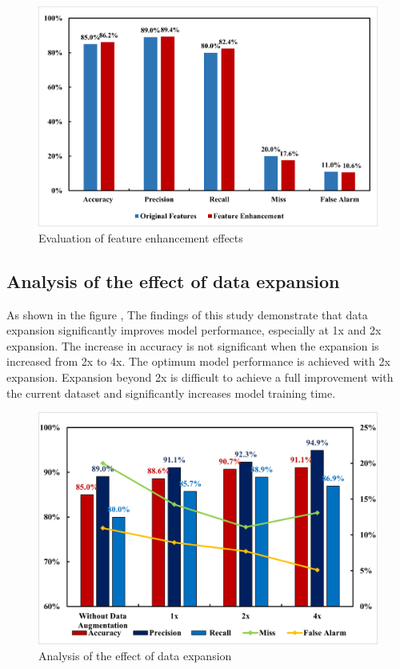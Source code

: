 \documentclass[journal,article,submit,pdftex,moreauthors]{Definitions/mdpi}
\begin{document}
\begin{figure}[h]
    \centering
    \includegraphics[width=0.75\linewidth]{图片/特征增强.png}
    \caption{Evaluation of feature enhancement effects}
    \label{fig:Evaluation of feature enhancement effects}
\end{figure}

\subsection{Analysis of the effect of data expansion}

As shown in the figure    \label{fig:Analysis of the effect of data expansion} , The findings of this study demonstrate that data expansion significantly improves model performance, especially at 1x and 2x expansion. The increase in accuracy is not significant when the expansion is increased from 2x to 4x. The optimum model performance is achieved with 2x expansion. Expansion beyond 2x is difficult to achieve a full improvement with the current dataset and significantly increases model training time.

\begin{figure}[h]
    \centering
    \includegraphics[width=0.75\linewidth]{图片/数据扩充.png}
    \caption{Analysis of the effect of data expansion}
    \label{fig:Analysis of the effect of data expansion}
\end{figure}
\end{document}
